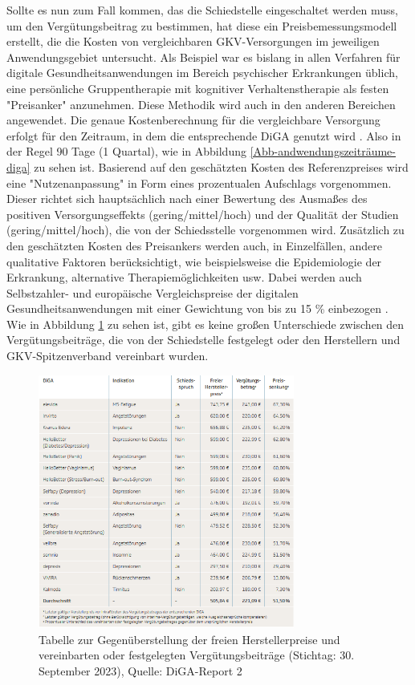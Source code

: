 \documentclass{article}
\begin{document}
			Sollte es nun zum Fall kommen, das die Schiedstelle eingeschaltet werden muss, um den Vergütungsbeitrag zu bestimmen, hat diese ein Preisbemessungsmodell erstellt, die die Kosten von vergleichbaren GKV-Versorgungen im jeweiligen Anwendungsgebiet untersucht. Als Beispiel war es bislang in allen Verfahren für digitale Gesundheitsanwendungen im Bereich psychischer Erkrankungen üblich, eine persönliche Gruppentherapie mit kognitiver Verhaltenstherapie als festen "Preisanker" anzunehmen. Diese Methodik wird auch in den anderen Bereichen angewendet. Die genaue Kostenberechnung für die vergleichbare Versorgung erfolgt für den Zeitraum, in dem die entsprechende DiGA genutzt wird \cite[vgl. S. 13]{TK-Report-2}. Also in der Regel 90 Tage (1 Quartal), wie in Abbildung \ref{Abb-andwendungszeiträume-diga} zu sehen ist. Basierend auf den geschätzten Kosten des Referenzpreises wird eine "Nutzenanpassung" in Form eines prozentualen Aufschlags vorgenommen. Dieser richtet sich hauptsächlich nach einer Bewertung des Ausmaßes des positiven Versorgungseffekts (gering/mittel/hoch) und der Qualität der Studien (gering/mittel/hoch), die von der Schiedsstelle vorgenommen wird. Zusätzlich zu den geschätzten Kosten des Preisankers werden auch, in Einzelfällen, andere qualitative Faktoren berücksichtigt, wie beispielsweise die Epidemiologie der Erkrankung, alternative Therapiemöglichkeiten usw. Dabei werden auch Selbstzahler- und europäische Vergleichspreise der digitalen Gesundheitsanwendungen mit einer Gewichtung von bis zu 15 \% einbezogen \cite[vgl. S. 13]{TK-Report-2}. Wie in Abbildung \ref{Tab-preise-diga} zu sehen ist, gibt es keine großen Unterschiede zwischen den Vergütungsbeiträge, die von der Schiedstelle festgelegt oder den Herstellern und GKV-Spitzenverband vereinbart wurden. 
			\begin{figure}[htbp]
				\centering
				\includegraphics[width=0.75\textwidth]{./grafiken/tabelle_preise_diga}
				\caption[Gegenüberstellung der freien Herstellerpreise und verinbarten oder festgelegten Vergütungsbeiträge]{Tabelle zur Gegenüberstellung der freien Herstellerpreise und vereinbarten oder festgelegten Vergütungsbeiträge (Stichtag: 30. September 2023), Quelle: DiGA-Report 2 \cite{TK-Report-2}}
				\label{Tab-preise-diga}
			\end{figure}
\end{document}
